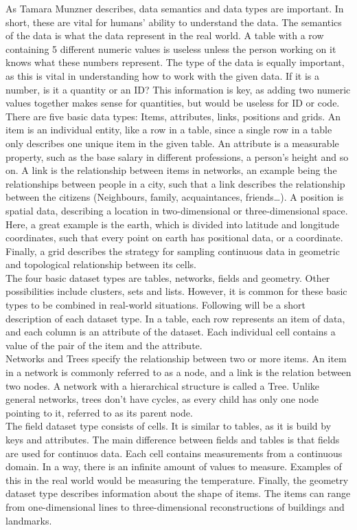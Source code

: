 \documentclass[Report.tex]{subfiles}
\begin{document}
As Tamara Munzner describes, data semantics and data types are important. In short, these are vital for humans’ ability to understand the data. The semantics of the data is what the data represent in the real world. A table with a row containing 5 different numeric values is useless unless the person working on it knows what these numbers represent. The type of the data is equally important, as this is vital in understanding how to work with the given data. If it is a number, is it a quantity or an ID? This information is key, as adding two numeric values together makes sense for quantities, but would be useless for ID or code.\\
There are five basic data types: Items, attributes, links, positions and grids. An item is an individual entity, like a row in a table, since a single row in a table only describes one unique item in the given table. An attribute is a measurable property, such as the base salary in different professions, a person’s height and so on. A link is the relationship between items in networks, an example being the relationships between people in a city, such that a link describes the relationship between the citizens (Neighbours, family, acquaintances, friends…). A position is spatial data, describing a location in two-dimensional or three-dimensional space. Here, a great example is the earth, which is divided into latitude and longitude coordinates, such that every point on earth has positional data, or a coordinate. Finally, a grid describes the strategy for sampling continuous data in geometric and topological relationship between its cells.\\
The four basic dataset types are tables, networks, fields and geometry. Other possibilities include clusters, sets and lists. However, it is common for these basic types to be combined in real-world situations. Following will be a short description of each dataset type. 
In a table, each row represents an item of data, and each column is an attribute of the dataset. Each individual cell contains a value of the pair of the item and the attribute.\\

Networks and Trees specify the relationship between two or more items. An item in a network is commonly referred to as a node, and a link is the relation between two nodes. 
A network with a hierarchical structure is called a Tree. Unlike general networks, trees don’t have cycles, as every child has only one node pointing to it, referred to as its parent node.\\

The field dataset type consists of cells. It is similar to tables, as it is build by keys and attributes. The main difference between fields and tables is that fields are used for continuos data. Each cell contains measurements from a continuous domain. In a way, there is an infinite amount of values to measure. Examples of this in the real world would be measuring the temperature. 
Finally, the geometry dataset type describes information about the shape of items. The items can range from one-dimensional lines to three-dimensional reconstructions of buildings and landmarks.  
\end{document}
